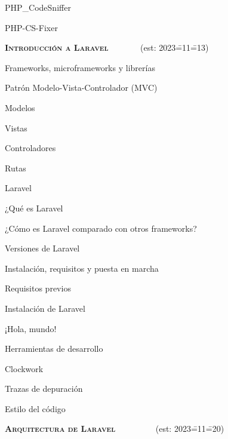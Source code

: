 \begin{longenum}
\begin{longenum}
        \begin{longenum}
            \item PHP\_CodeSniffer
            \item PHP-CS-Fixer
        \end{longenum}
    \end{longenum}
    \item \textbf{\textsc{Introducción a Laravel}} \ \ \ \ \ \ \ (est: 2023\==11\==13)
    \begin{longenum}
        \item Frameworks, microframeworks y librerías
        \item Patrón Modelo-Vista-Controlador (MVC)
        \begin{longenum}
            \item Modelos
            \item Vistas
            \item Controladores
            \item Rutas
        \end{longenum}
        \item Laravel
        \begin{longenum}
            \item ¿Qué es Laravel
            \item ¿Cómo es Laravel comparado con otros frameworks?
            \item Versiones de Laravel
        \end{longenum}
        \item Instalación, requisitos y puesta en marcha
        \begin{longenum}
            \item Requisitos previos
            \item Instalación de Laravel
        \end{longenum}
        \item ¡Hola, mundo!
        \item Herramientas de desarrollo
        \begin{longenum}
            \item Clockwork
            \item Trazas de depuración
        \end{longenum}
        \item Estilo del código
    \end{longenum}
    \item \textbf{\textsc{Arquitectura de Laravel}} \ \ \ \ \ \ \ \ \ (est: 2023\==11\==20)

\end{longenum}
